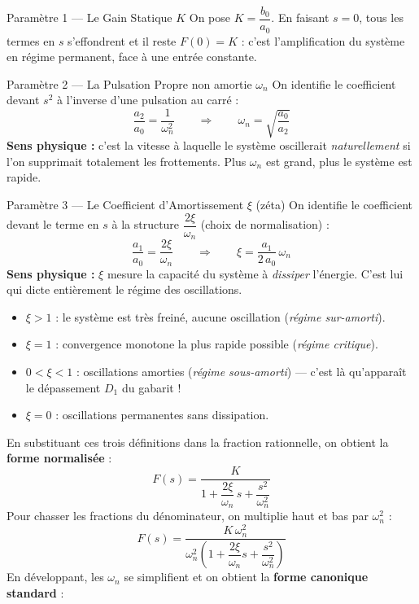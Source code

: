 \documentclass[11pt,a4paper]{report}
\begin{document}
\begin{defbox}{Paramètre 1 — Le Gain Statique $K$}
On pose $K = \dfrac{b_0}{a_0}$. En faisant $s = 0$, tous les termes en $s$ s'effondrent et il reste $F(0) = K$ : c'est l'amplification du système en régime permanent, face à une entrée constante.
\end{defbox}

\begin{defbox}{Paramètre 2 — La Pulsation Propre non amortie $\omega_n$}
On identifie le coefficient devant $s^2$ à l'inverse d'une pulsation au carré :
\[
  \frac{a_2}{a_0} = \frac{1}{\omega_n^2} \qquad \Longrightarrow \qquad \omega_n = \sqrt{\frac{a_0}{a_2}}
\]
\textbf{Sens physique :} c'est la vitesse à laquelle le système oscillerait \emph{naturellement} si l'on supprimait totalement les frottements. Plus $\omega_n$ est grand, plus le système est rapide.
\end{defbox}

\begin{defbox}{Paramètre 3 — Le Coefficient d'Amortissement $\xi$ (zéta)}
On identifie le coefficient devant le terme en $s$ à la structure $\dfrac{2\xi}{\omega_n}$ (choix de normalisation) :
\[
  \frac{a_1}{a_0} = \frac{2\xi}{\omega_n} \qquad \Longrightarrow \qquad \xi = \frac{a_1}{2\,a_0}\,\omega_n
\]
\textbf{Sens physique :} $\xi$ mesure la capacité du système à \emph{dissiper} l'énergie. C'est lui qui dicte entièrement le régime des oscillations.
\begin{itemize}
  \item $\xi > 1$ : le système est très freiné, aucune oscillation (\textit{régime sur-amorti}).
  \item $\xi = 1$ : convergence monotone la plus rapide possible (\textit{régime critique}).
  \item $0 < \xi < 1$ : oscillations amorties (\textit{régime sous-amorti}) — c'est là qu'apparaît le dépassement $D_1$ du gabarit !
  \item $\xi = 0$ : oscillations permanentes sans dissipation.
\end{itemize}
\end{defbox}

En substituant ces trois définitions dans la fraction rationnelle, on obtient la \textbf{forme normalisée} :
\[
  F(s) = \frac{K}{1 + \dfrac{2\xi}{\omega_n}\,s + \dfrac{s^2}{\omega_n^2}}
\]
Pour chasser les fractions du dénominateur, on multiplie haut et bas par $\omega_n^2$ :
\[
  F(s) = \frac{K\,\omega_n^2}{\omega_n^2\!\left(1 + \dfrac{2\xi}{\omega_n}s + \dfrac{s^2}{\omega_n^2}\right)}
\]
En développant, les $\omega_n$ se simplifient et on obtient la \textbf{forme canonique standard} :
\end{document}

